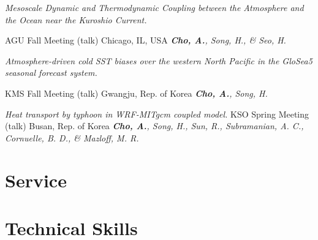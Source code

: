 \documentclass[11pt,usletter,sans]{moderncv}
\begin{document}
\vspace{0.5em}


        {\parbox[t]{0.8\textwidth}{\textit{Mesoscale Dynamic and Thermodynamic Coupling between the Atmosphere and the Ocean near the Kuroshio Current.}}}
        {AGU Fall Meeting (talk)}   %
        {Chicago, IL, USA}            %
        {}
        {\emph{\textbf{Cho, A.}, Song, H., \& Seo, H.}}
        
\vspace{0.8em}

        {\parbox[t]{0.7\textwidth}{\textit{Atmosphere-driven cold SST biases over the western North Pacific in the GloSea5 seasonal forecast system.}}}
        {KMS Fall Meeting (talk)}   %
        {Gwangju, Rep. of Korea}            %
        {}
        {\emph{\textbf{Cho, A.}, Song, H.}}
        
\vspace{0.5em}

        {\textit{Heat transport by typhoon in WRF-MITgcm coupled model.}}
        {KSO Spring Meeting (talk)}   %
        {Busan, Rep. of Korea}            %
        {}
        {\emph{\textbf{Cho, A.}, Song, H., Sun, R., Subramanian, A. C., Cornuelle, B. D., \& Mazloff, M. R.}}
        
\vspace{0.5em}

\section{Service}

\section{Technical Skills}

\end{document}
